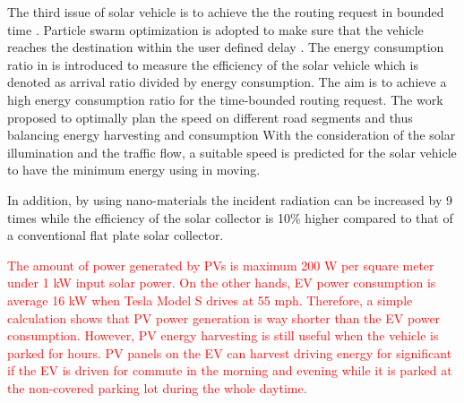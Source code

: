 The third issue of solar vehicle is to achieve the the routing request in bounded time \cite{JX_chen2013green,JX_aqeel2016optimized,JX_elizabeth2016velocity,JX_lv2016speed}.
Particle swarm optimization is adopted to make sure that the vehicle reaches the destination within the user defined delay \cite{JX_chen2013green}.
The energy consumption ratio in \cite{JX_aqeel2016optimized} is introduced to measure the efficiency of the solar vehicle which is denoted as arrival ratio divided by energy consumption. The aim is to achieve a high energy consumption ratio for the time-bounded routing request.
The work \cite{JX_elizabeth2016velocity} proposed to optimally plan the speed on different road segments and thus balancing energy harvesting and consumption
With the consideration of the solar illumination and the traffic flow, a suitable speed is predicted for the solar vehicle to have the minimum energy using in moving.

In addition, by using nano-materials the incident radiation can be increased by 9 times \cite{JX_abdin2013solar} while the efficiency of the solar collector is 10\% higher compared to that of a conventional flat plate solar collector.

\textcolor{red}{The amount of power generated by PVs is maximum 200 W per square meter under 1 kW input solar power. On the other hands, EV power consumption is average 16 kW when Tesla Model S drives at 55 mph. Therefore, a simple calculation shows that PV power generation is way shorter than the EV power consumption. However, PV energy harvesting is still useful when the vehicle is parked for hours. PV panels on the EV can harvest  driving energy for significant if the EV is driven for commute in the morning and evening while it is parked at the non-covered parking lot during the whole daytime.}



